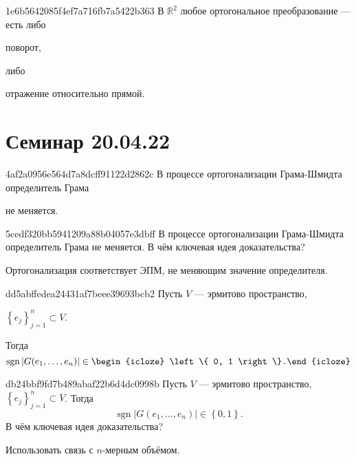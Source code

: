 \begin{note}{1e6b5642085f4ef7a716fb7a5422b363}
    В \({ \mathbb R^2 }\) любое ортогональное преобразование --- есть либо \begin{icloze}{1}поворот,\end{icloze} либо \begin{icloze}{2}отражение относительно прямой.\end{icloze}
\end{note}

\section{Семинар 20.04.22}
\begin{note}{4af2a0956e564d7a8dcff91122d2862c}
    В процессе ортогонализации Грама-Шмидта определитель Грама \begin{icloze}{1}не меняется.\end{icloze}
\end{note}

\begin{note}{5cedf320bb5941209a88b04057e3dbff}
    В процессе ортогонализации Грама-Шмидта определитель Грама не меняется.
    В чём ключевая идея доказательства?

    \begin{cloze}{1}
        Ортогонализация соответствует ЭПМ, не меняющим значение определителя.
    \end{cloze}
\end{note}

\begin{note}{dd5abffedea24431af7beee39693bcb2}
    Пусть \({ V }\) --- эрмитово пространство, \begin{icloze}{2}\({ \left\{ e_j \right\}_{j = 1}^{n} \subset V }\).\end{icloze}
    Тогда
    \[
        \operatorname{sgn} \left\lvert G(e_1, \ldots, e_n) \right\rvert \in \begin{icloze}{1}\left\{ 0, 1 \right\}.\end{icloze}
    \]
\end{note}

\begin{note}{db24bbf9fd7b489abaf22b6d4dc0998b}
    Пусть \({ V }\) --- эрмитово пространство, \({ \left\{ e_j \right\}_{j = 1}^{n} \subset V }\).
    Тогда
    \[
        \operatorname{sgn} \left\lvert G(e_1, \ldots, e_n) \right\rvert \in \left\{ 0, 1 \right\}.
    \]
    В чём ключевая идея доказательства?

    \begin{cloze}{1}
        Использовать связь с \({ n }\)-мерным объёмом.
    \end{cloze}
\end{note}

